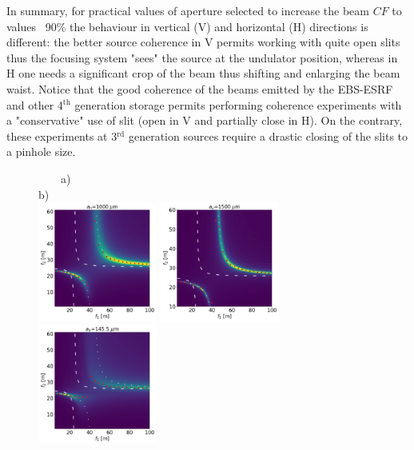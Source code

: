 \documentclass{osa-article}
\begin{document}
In summary, for practical values of aperture selected to increase the beam $CF$ to values ~90\% the behaviour in vertical (V) and horizontal (H) directions is different: the better source coherence in V permits working with quite open slits thus the focusing system "sees" the source at the undulator position, whereas in H one needs a significant crop of the beam thus shifting and enlarging the beam waist. Notice that the good coherence of the beams emitted by the EBS-ESRF and other 4$^{\text{th}}$ generation storage permits performing coherence experiments with a "conservative" use of slit (open in V and partially close in H). On the contrary, these experiments at 3$^{\text{rd}}$ generation sources require a drastic closing of the slits to a pinhole size.      

\begin{figure}[htbp]
~~~~a)~~~~~~~~~~~~~~~~~~~~~~~~~~~~~~~~~~~~~~~~~~~~~~~~~~~~~~b) \\
\hspace{-1.1cm}
\includegraphics[width=0.35\textwidth]{H_3.png}
\includegraphics[width=0.35\textwidth]{V_3.png}\\
\includegraphics[width=0.35\textwidth]{H_2.png}

\end{figure}
\end{document}
